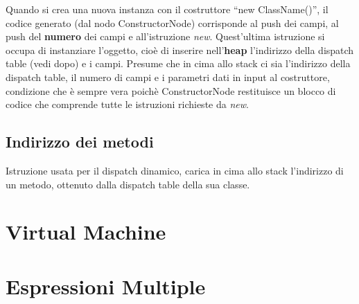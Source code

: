 \documentclass{scrreprt}
\begin{document}
Quando si crea una nuova instanza con il costruttore ``new ClassName()'', il codice generato (dal nodo ConstructorNode) corrisponde al push dei campi, al push del \textbf{numero} dei campi e all'istruzione \textit{new}. Quest'ultima 
istruzione si occupa di instanziare l'oggetto, cioè di inserire nell'\textbf{heap} l'indirizzo della dispatch table (vedi dopo) e i campi. Presume che in cima allo stack ci sia l'indirizzo della dispatch table, 
il numero di campi e i parametri dati in input al costruttore, condizione che è sempre vera poichè ConstructorNode restituisce un blocco di codice che comprende tutte le istruzioni richieste da \textit{new}.

\subsection{Indirizzo dei metodi}
Istruzione usata per il dispatch dinamico, carica in cima allo stack l'indirizzo di un metodo, ottenuto dalla
dispatch table della sua classe. 

\section{Virtual Machine}

\section{Espressioni Multiple}
\end{document}

